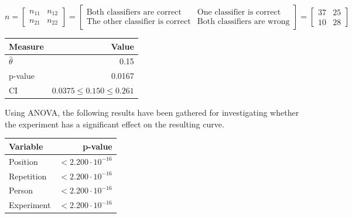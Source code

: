 \documentclass[11pt, fleqn, titlepage]{article}
\begin{document}
\[n = \begin{bmatrix} n_{11} & n_{12} \\ n_{21} & n_{22} \end{bmatrix} = \begin{bmatrix} \text{Both classifiers are correct} & \text{One classifier is correct} \\ \text{The other classifier is correct} & \text{Both classifiers are wrong} \end{bmatrix} = \begin{bmatrix} 37 & 25 \\ 10 & 28 \end{bmatrix}\] 

\begin{table}[H]
	\centering
	\begin{tabular}{l r}
		\toprule
		Measure        & Value                          \\ \midrule
		$\hat{\theta}$ & 0.15                           \\ 
		p-value        & 0.0167                         \\ 
		CI             & $0.0375 \leq 0.150 \leq 0.261$ \\ \bottomrule
	\end{tabular}
\end{table}

\noindent Using ANOVA, the following results have been gathered for investigating whether the experiment has a significant effect on the resulting curve.

\begin{table}[H]
	\centering
	\begin{tabular}{l r}
		\toprule
		Variable       & p-value                         \\ \midrule
		Position       & $<2.200 \cdot 10^{-16}$         \\ 
		Repetition     & $<2.200 \cdot 10^{-16}$         \\ 
		Person         & $<2.200 \cdot 10^{-16}$         \\ 
		Experiment     & $<2.200 \cdot 10^{-16}$         \\ \bottomrule
	\end{tabular}
\end{table}



\end{document}
